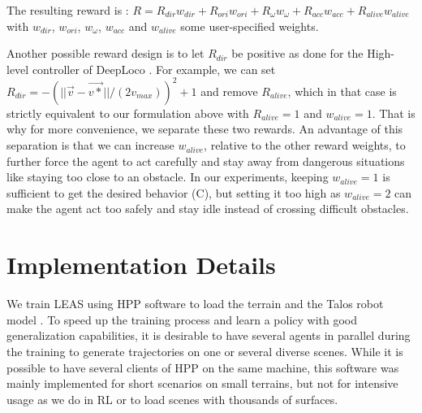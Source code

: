 The resulting reward is :
$R = R_{dir} w_{dir} + R_{ori} w_{ori} + R_{\omega} w_{\omega} + R_{acc} w_{acc} + R_{alive} w_{alive}$\\
with $w_{dir}$, $w_{ori}$, $w_{\omega}$, $w_{acc}$ and $w_{alive}$ some user-specified weights.

\hfill %

Another possible reward design is to let $R_{dir}$ be positive as done for the High-level controller of DeepLoco \cite{deepLoco}. 
For example, we can set $R_{dir}=-(||\overrightarrow{v} - \overrightarrow{v*}||/(2 v_{max}))^2 + 1$ and remove $R_{alive}$, which in that case is strictly equivalent to our formulation above with $R_{alive}=1$ and $w_{alive}=1$.
That is why for more convenience, we separate these two rewards. 
An advantage of this separation is that we can increase $w_{alive}$, relative to the other reward weights, to further force the agent to act carefully and stay away from dangerous situations like staying too close to an obstacle. 
In our experiments, keeping $w_{alive}=1$ is sufficient to get the desired behavior (C), but setting it too high as $w_{alive}=2$ can make the agent act too safely and stay idle instead of crossing difficult obstacles.

\section{Implementation Details\label{subsec:leas-implementation}}


We train LEAS using HPP software \cite{HPP} to load the terrain and the Talos robot model \cite{talos_robot}. 
To speed up the training process and learn a policy with good generalization capabilities, it is desirable to have several agents in parallel during the training to generate trajectories on one or several diverse scenes.
While it is possible to have several clients of HPP on the same machine, this software was mainly implemented for short scenarios on small terrains, but not for intensive usage as we do in RL or to load scenes with thousands of surfaces. 

